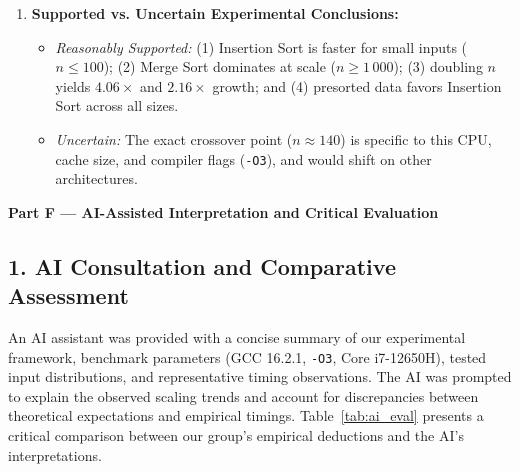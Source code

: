 \documentclass[11pt]{article}
\begin{document}
\begin{enumerate}[itemsep=0.08em, topsep=0.1em]
    \item \textbf{Supported vs. Uncertain Experimental Conclusions:}
    \begin{itemize}[itemsep=0.02em, topsep=0.05em]
        \item \textit{Reasonably Supported:} (1) Insertion Sort is faster for small inputs ($n \le 100$); (2) Merge Sort dominates at scale ($n \ge 1\,000$); (3) doubling $n$ yields $4.06\times$ and $2.16\times$ growth; and (4) presorted data favors Insertion Sort across all sizes.
        \item \textit{Uncertain:} The exact crossover point ($n \approx 140$) is specific to this CPU, cache size, and compiler flags (\texttt{-O3}), and would shift on other architectures.
    \end{itemize}
\end{enumerate}

\newpage

{\centering\fontsize{15}{18}\selectfont\textbf{Part F --- AI-Assisted Interpretation and Critical Evaluation}\par}
\vspace{0.6em}

\subsection*{1. AI Consultation and Comparative Assessment}
An AI assistant was provided with a concise summary of our experimental framework, benchmark parameters (GCC 16.2.1, \texttt{-O3}, Core i7-12650H), tested input distributions, and representative timing observations. The AI was prompted to explain the observed scaling trends and account for discrepancies between theoretical expectations and empirical timings. Table~\ref{tab:ai_eval} presents a critical comparison between our group's empirical deductions and the AI's interpretations.
\end{document}
